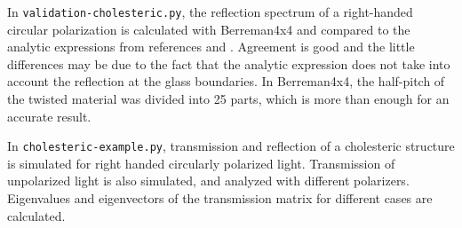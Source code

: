 In \verb/validation-cholesteric.py/, the reflection spectrum of a right-handed circular polarization is calculated with Berreman4x4 and compared to the analytic expressions from references  and .
Agreement is good and the little differences may be due to the fact that the analytic expression does not take into account the reflection at the glass boundaries.
In Berreman4x4, the half-pitch of the twisted material was divided into 25 parts, which is more than enough for an accurate result.

In \verb/cholesteric-example.py/, transmission and reflection of a cholesteric structure is simulated for right handed circularly polarized light.
Transmission of unpolarized light is also simulated, and analyzed with different polarizers.
Eigenvalues and eigenvectors of the transmission matrix for different cases are calculated.


